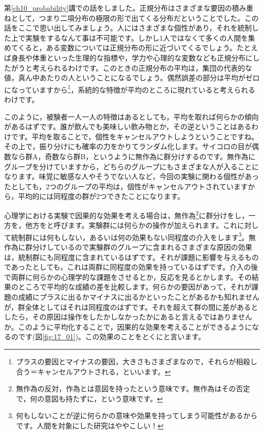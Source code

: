 \documentclass{ltjbook}
\begin{document}
第\ref{ch10_probability}講での話をしました。正規分布はさまざまな要因の積み重ねとして，つまり二項分布の極限の形で出てくる分布だということでした。この話をここで思い出してみましょう。人にはさまざまな個性があり，それを統制した上で実験をするなんて事は不可能です。しかし1人ではなくて多くの人間を集めてくると，ある変数については正規分布の形に近づいてくるでしょう。たとえば身長や体重といった生理的な指標や，学力や心理的な変数なども正規分布にしたがうと考えられるわけです。このときの正規分布の平均は，集団の代表的な値，真ん中あたりの人ということになるでしょう。偶然誤差の部分は平均がゼロになっていますから\footnote{プラスの要因とマイナスの要因，大きさもさまざまなので，それらが相殺し合う＝キャンセルアウトされる，といいます。}，系統的な特徴が平均のところに現れていると考えられるわけです。

このように，被験者一人一人の特徴はあるとしても，平均を取れば何らかの傾向があるはずです。誰が飲んでも美味しい飲み物とか，その逆ということはあるわけです。平均を取ることで，個性をキャンセルアウトしようということですね。
その上で，振り分けにも確率の力をかりてランダム化します。サイコロの目が偶数なら群A，奇数なら群B，というように無作為に群分けするのです。無作為にグループを分けていますから，どちらのグループにもさまざまな人が入ることになります。味覚に敏感な人やそうでない人など，今回の実験に関わる個性があったとしても，2つのグループの平均は，個性がキャンセルアウトされていますから，平均的には同程度の群が2つできたことになります。

心理学における実験で因果的な効果を考える場合は，無作為\footnote{無作為の反対，作為とは意図を持ったという意味です。無作為はその否定で，何の意図も持たずに，という意味です。}に群分けをし，一方を，他方をと呼びます。実験群には何らかの操作が加えられます。これに対して統制群には何もしない，あるいは何の効果もない同程度の介入をします\footnote{何もしないことが逆に何らかの意味や効果を持ってしまう可能性があるからです。人間を対象にした研究はややこしい！}。無作為に群分けしているので実験群のグループに含まれるさまざまな原因の効果は，統制群にも同程度に含まれているはずです。それが課題に影響を与えるものであったとしても，これは両群に同程度の効果を持っているはずです。介入の後で両群に何らかの心理学的な課題をさせるとか，反応を見るとかします。その結果のところで平均的な成績の差を比較します。何らかの要因があって，それが課題の成績にプラスに出るかマイナスに出るかといったことがあるかも知れませんが，群全体としてはそれは同程度のはずです。それを超えて群の間に差があるとしたら，その原因は操作をしたかしなかったかにあると言えるではありませんか。このように平均化することで，因果的な効果を考えることができるようになるのです(図\ref{fig:17_01})。この効果のことをとくにと言います。
\end{document}
